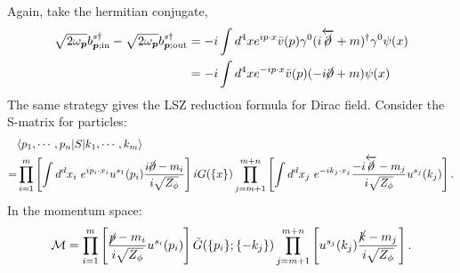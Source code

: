 Again, take the hermitian conjugate,
\begin{equation}
\begin{aligned}
	\sqrt{2\omega_{\bm p}}b^{s \dagger}_{\bm p;\mathrm{in}} - 
	\sqrt{2\omega_{\bm p}}b^{s \dagger}_{\bm p;\mathrm{out}} 
	&= -i\int d^4x e^{ip\cdot x}\bar v(p)\gamma^0(i\overleftarrow{\cancel\partial} + m)^\dagger \gamma^0 \psi(x) \\
	&= -i\int d^4x e^{-ip\cdot x}\bar v(p)(-i \cancel\partial + m) \psi(x)
\end{aligned}
\end{equation}
The same strategy gives the LSZ reduction formula for Dirac field.
Consider the S-matrix for particles:
\begin{equation}
\begin{aligned}
	& \langle p_1, \cdots, p_n| S |k_1, \cdots, k_m\rangle  \\
	=& \prod_{i=1}^{m}\left[ \int d^dx_i \ e^{ip_i\cdot x_i} u^{s_1}(p_i)\frac{i\cancel\partial-m_i}{i\sqrt{Z_\phi}}\right] iG(\{x\})
	\prod_{j=m+1}^{m+n}\left[\int d^dx_j \ e^{-ik_j\cdot x_j}\frac{-i\overleftarrow{\cancel\partial}-m_j}{i\sqrt{Z_\phi}}u^{s_j}(k_j)\right].
\end{aligned}
\end{equation}
In the momentum space:
\begin{equation}
	\mathcal M = \prod_{i=1}^{m}\left[\frac{\cancel p-m_i}{i\sqrt{Z_\phi}}u^{s_i}(p_i)\right]
		\tilde{G}(\{p_i\};\{-k_j\})
		\prod_{j=m+1}^{m+n}\left[u^{s_j}(k_j)\frac{\cancel k-m_j}{i\sqrt{Z_\phi}}\right].
\end{equation}



